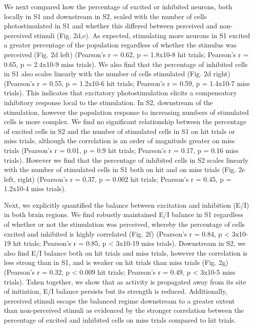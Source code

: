 We next compared how the percentage of excited or inhibited neurons, both locally in S1 and downstream in S2, scaled with the number of cells photostimulated in S1 and whether this differed between perceived and non-perceived stimuli (Fig. 2d,e). As expected, stimulating more neurons in S1 excited a greater percentage of the population regardless of whether the stimulus was perceived (Fig. 2d left) (Pearson’s r = 0.62, p  = 1.8x10-8 hit trials; Pearson’s r = 0.65, p = 2.4x10-9 miss trials). We also find that the percentage of inhibited cells in S1 also scales linearly with the number of cells stimulated (Fig. 2d right) (Pearson’s r = 0.55, p = 1.2x10-6 hit trials; Pearson’s r = 0.59, p = 1.4x10-7 miss trials). This indicates that excitatory photostimulation elicits a compensatory inhibitory response local to the stimulation. In S2, downstream of the stimulation, however the population response to increasing numbers of stimulated cells is more complex. We find no significant relationship between the percentage of excited cells in S2 and the number of stimulated cells in S1 on hit trials or miss trials, although the correlation is an order of magnitude greater on miss trials (Pearson’s r = 0.01, p = 0.9 hit trials; Pearson’s r = 0.17, p = 0.16 miss trials). However we find that the percentage of inhibited cells in S2 scales linearly with the number of stimulated cells in S1 both on hit and on miss trials (Fig. 2e left, right) (Pearson’s r = 0.37, p = 0.002 hit trials; Pearson’s r = 0.45, p = 1.2x10-4 miss trials).

Next, we explicitly quantified the balance between excitation and inhibition (E/I) in both brain regions. We find robustly maintained E/I balance in S1 regardless of whether or not the stimulation was perceived, whereby the percentage of cells excited and inhibited is highly correlated (Fig. 2f) (Pearson’s r = 0.84, p < 3x10-19 hit trials; Pearson’s r = 0.85, p < 3x10-19 miss trials). Downstream in S2, we also find E/I balance both on hit trials and miss trials, however the correlation is less strong than in S1, and is weaker on hit trials than miss trials (Fig. 2g) (Pearson’s r = 0.32, p < 0.009 hit trials; Pearson’s r = 0.49, p < 3x10-5 miss trials). Taken together, we show that as activity is propagated away from its site of initiation, E/I balance persists but its strength is reduced. Additionally, perceived stimuli escape the balanced regime downstream to a greater extent than non-perceived stimuli as evidenced by the stronger correlation between the percentage of excited and inhibited cells on miss trials compared to hit trials. 


